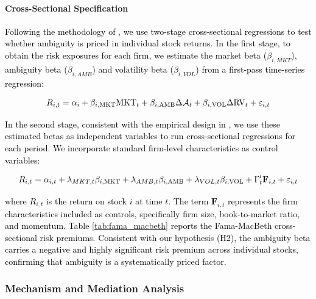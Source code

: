 \documentclass[preprint,12pt,authoryear]{elsarticle}
\begin{document}
\paragraph{Cross-Sectional Specification}
\textcolor{black}{
Following the methodology of \citet{famaRiskReturnEquilibrium1973}, we use two-stage cross-sectional regressions to test whether ambiguity is priced in individual stock returns. In the first stage, to obtain the risk exposures for each firm, we estimate the market beta ($\beta_{i,MKT}$), ambiguity beta ($\beta_{i,AMB}$) and volatility beta ($\beta_{i,VOL}$) from a first-pass time-series regression:}

\begin{equation}
\textcolor{black}{
R_{i,t} = \alpha_i + \beta_{i,\text{MKT}} \text{MKT}_t + \beta_{i,\text{AMB}} \Delta \mathcal{A}_t + \beta_{i,\text{VOL}} \Delta \text{RV}_t + \varepsilon_{i,t}
}
\end{equation}

\textcolor{black}{In the second stage, consistent with the empirical design in \citet{Fama1992Cross}, we use these estimated betas as independent variables to run cross-sectional regressions for each period. We incorporate standard firm-level characteristics as control variables:}

\begin{equation}
\textcolor{black}{
R_{i,t} = \alpha_{i,t} + \lambda_{MKT,t} \beta_{i,\text{MKT}} + \lambda_{AMB,t} \beta_{i,\text{AMB}} + \lambda_{VOL,t} \beta_{i,\text{VOL}} + \Gamma_{t}' \mathbf{F}_{i,t} + \varepsilon_{i,t}
}
\end{equation}

\textcolor{black}{where $R_{i,t}$ is the return on stock $i$ at time $t$. The term $\mathbf{F}_{i,t}$ represents the firm characteristics included as controls, specifically firm size, book-to-market ratio, and momentum. Table \ref{tab:fama_macbeth} reports the Fama-MacBeth cross-sectional risk premiums. Consistent with our hypothesis (H2), the ambiguity beta carries a negative and highly significant risk premium across individual stocks, confirming that ambiguity is a systematically priced factor.}

\subsubsection{Mechanism and Mediation Analysis}
\end{document}
